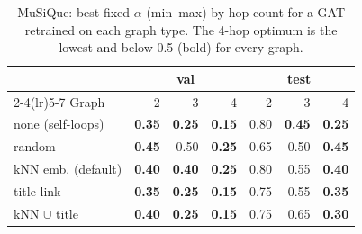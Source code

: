 \begin{table}[t]
\centering\small\setlength{\tabcolsep}{3pt}
\begin{tabular}{lrrrrrr}
\toprule
 & \multicolumn{3}{c}{val} & \multicolumn{3}{c}{test} \\
\cmidrule(lr){2-4}\cmidrule(lr){5-7}
Graph & 2 & 3 & 4 & 2 & 3 & 4 \\
\midrule
none (self-loops) & \textbf{0.35} & \textbf{0.25} & \textbf{0.15} & 0.80 & \textbf{0.45} & \textbf{0.25} \\
random & \textbf{0.45} & 0.50 & \textbf{0.25} & 0.65 & 0.50 & \textbf{0.45} \\
kNN emb. (default) & \textbf{0.40} & \textbf{0.40} & \textbf{0.25} & 0.80 & 0.55 & \textbf{0.40} \\
title link & \textbf{0.35} & \textbf{0.25} & \textbf{0.15} & 0.75 & 0.55 & \textbf{0.35} \\
kNN $\cup$ title & \textbf{0.40} & \textbf{0.25} & \textbf{0.15} & 0.75 & 0.65 & \textbf{0.30} \\
\bottomrule
\end{tabular}
\caption{MuSiQue: best fixed $\alpha$ (min--max) by hop count for a GAT retrained on each graph type. The 4-hop optimum is the lowest and below 0.5 (bold) for every graph.}
\label{tab:graphhops}
\end{table}
